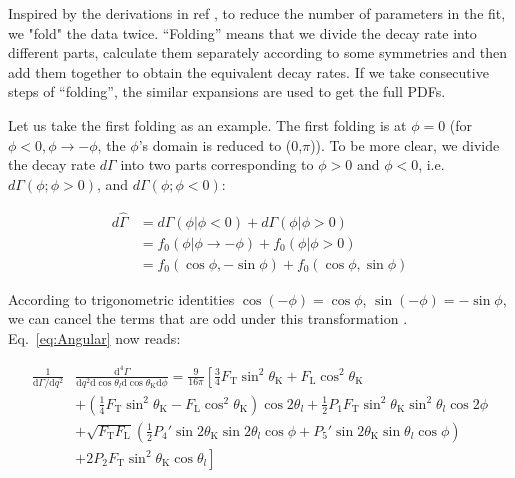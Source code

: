 Inspired by the derivations in ref \cite{LHCb2}\cite{Matias2012}, to
reduce the number of parameters in the fit, we "fold" the data
twice. ``Folding'' means that we divide the decay rate into different
parts, calculate them separately according to some symmetries and then
add them together to obtain the equivalent decay rates. If we take
consecutive steps of ``folding'', the similar expansions are used to
get the full PDFs.

Let us take the first folding as an example.
The first folding is at
$ \phi=0$ (for $\phi<0,\phi\rightarrow-\phi$, the $\phi$'s domain is reduced to
    (0,$\pi$)). To be more clear, we divide the decay rate $d\Gamma$
into two parts corresponding to $\phi>0$ and $\phi<0$,
i.e. $d\Gamma(\phi;\phi>0)$, and $d\Gamma(\phi;\phi<0)$:

\begin{equation} \label{eq:folding}
    \begin{split}
        d\hat{\Gamma} &= d\Gamma(\phi|\phi<0) + d\Gamma(\phi|\phi>0) \\
        & = f_0(\phi|\phi\rightarrow-\phi) + f_0(\phi|\phi>0) \\
        & = f_0(\cos\phi, -\sin\phi) + f_0(\cos\phi, \sin\phi)
    \end{split}
\end{equation}


According to trigonometric identities $\cos(-\phi) = \cos\phi $,
$\sin(-\phi) = -\sin\phi $, we can cancel the terms 
that are odd under this transformation
. Eq.~\ref{eq:Angular} now reads:

\begin{equation} \label{eq:fold1}
    \begin{split}
        \frac{1}{\mathrm{d}\Gamma/\mathrm{d}q^2}&\frac{\mathrm{d}^4\Gamma}{\mathrm{d}q^2 \mathrm{d}\cos\theta_l \mathrm{d}\cos\theta_\mathrm{K} \mathrm{d}\phi} = \frac{9}{16\pi}\left[\frac{3}{4}F_\mathrm{T}\sin^2\theta_\mathrm{K} + F_\mathrm{L}\cos^2\theta_\mathrm{K} \right.\\
            &\left.+(\frac{1}{4}F_\mathrm{T}\sin^2\theta_\mathrm{K}-F_\mathrm{L}\cos^2\theta_\mathrm{K})\cos2\theta_l+\frac{1}{2}P_1F_\mathrm{T}\sin^2\theta_\mathrm{K}\sin^2\theta_l\cos 2\phi \right.\\
            &+\sqrt{F_\mathrm{T}F_\mathrm{L}}(\frac{1}{2}P_4'\sin2\theta_\mathrm{K}\sin2\theta_l\cos\phi+P_5'\sin2\theta_\mathrm{K}\sin\theta_l\cos\phi )\\
            &\left.+2P_2F_\mathrm{T}\sin^2\theta_\mathrm{K}\cos\theta_l \right]
    \end{split}
\end{equation}

